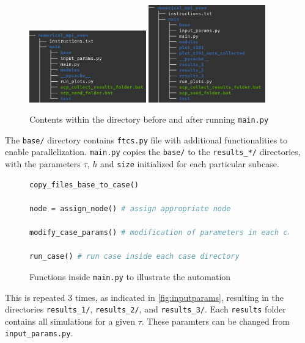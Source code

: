 \begin{figure}[H]
    \centering
    \includegraphics[width=0.45\textwidth]{figures/parallel_dir0.png}
    \includegraphics[width=0.45\textwidth]{figures/parallel_dir1.png}
    \caption{Contents within the directory before and after running \texttt{main.py}}
\end{figure}

The \texttt{base/} directory contains \texttt{ftcs.py} file with additional functionalities to enable parallelization. \texttt{main.py} copies the \texttt{base/} to the \texttt{results\_*/} directories, with the parameters $\tau$, $h$ and \texttt{size} initialized for each particular subcase.

\begin{figure}[H]
\begin{lstlisting}[language=Python]
copy_files_base_to_case()

node = assign_node() # assign appropriate node

modify_case_params() # modification of parameters in each case

run_case() # run case inside each case directory
\end{lstlisting}
\caption{Functions inside \texttt{main.py} to illustrate the automation}
\label{fig:mainpy}
\end{figure}

This is repeated 3 times, as indicated in \autoref{fig:inputparams}, resulting in the directories \texttt{results\_1/}, \texttt{results\_2/}, and \texttt{results\_3/}. Each \texttt{results} folder contains all simulations for a given $\tau$. These paramters can be changed from \texttt{input\_params.py}.

